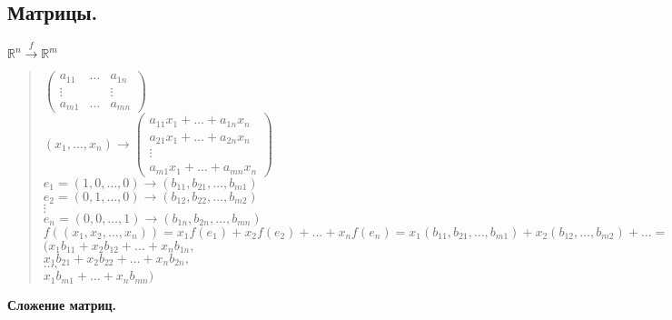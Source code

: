 \documentclass{article}
\begin{document}
	\subsection{Матрицы.}
	\underline{$\mathbb{R}^n \xrightarrow{f} \mathbb{R}^m$}
	\begin{quote}
		$\left(
		\begin{smallmatrix}
			a_{11} & \dots & a_{1n} \\
			\vdots &  & \vdots \\
			a_{m1} & \dots & a_{mn}
		\end{smallmatrix}
		\right)$ \\
		$(x_1, \dots, x_n) \rightarrow \left(
		\begin{smallmatrix}
			a_{11}x_1 + \dots + a_{1n}x_n \\
			a_{21}x_1 + \dots + a_{2n}x_n \\
			\vdots \\
			a_{m1}x_1 + \dots + a_{mn}x_n
		\end{smallmatrix}
		\right)$ \\
		$e_1 = (1, 0, \dots, 0) \rightarrow (b_{11}, b_{21}, \dots, b_{m1})$ \\
		$e_2 = (0, 1, \dots, 0) \rightarrow (b_{12}, b_{22}, \dots, b_{m2})$ \\
		$\vdots$ \\
		$e_n = (0, 0, \dots, 1) \rightarrow (b_{1n}, b_{2n}, \dots, b_{mn})$ \\
		$f((x_1, x_2, \dots, x_n)) = x_1 f(e_1) + x_2 f(e_2) + \dots + x_n f(e_n) = x_1 (b_{11}, b_{21}, \dots, b_{m1}) + x_2 (b_{12}, \dots, b_{m2}) + \dots =$ \\
		$(x_1 b_{11} + x_2 b_{12} + \dots + x_n b_{1n},$ \\
		$x_1 b_{21} + x_2 b_{22} + \dots + x_n b_{2n},$ \\
		$\dots,$ \\
		$x_1 b_{m1} + \dots + x_n b_{mn})$
	\end{quote}
	\textbf{Сложение матриц.}
\end{document}

